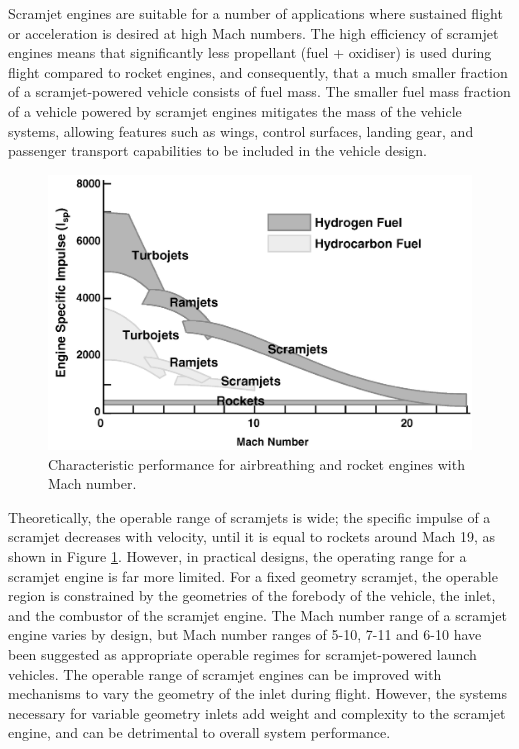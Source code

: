     Scramjet engines are suitable for a number of applications where sustained flight or acceleration is desired at high Mach numbers. 
    The high efficiency of scramjet engines means that significantly less propellant (fuel + oxidiser) is used during flight compared to rocket engines, and consequently, that a much smaller fraction of a scramjet-powered vehicle consists of fuel mass\cite{Curran2003}. 
    The smaller fuel mass fraction of a vehicle powered by scramjet engines mitigates the mass of the vehicle systems, allowing features such as wings, control surfaces, landing gear, and passenger transport capabilities to be included in the vehicle design\cite{Curran2003}. 
    
    \begin{figure}[ht]
    	\centering
    	\includegraphics[width=0.7\linewidth]{figures/2_literature-review/Scramjet-Efficiency}
    	\caption{Characteristic performance for airbreathing and rocket engines with Mach number\cite{Fry2004}.}
    	\label{fig:Scramjet-Efficiency}
    \end{figure}
    
    Theoretically, the operable range of scramjets is wide\cite{Smart2007a}; the specific impulse of a scramjet decreases with velocity, until it is equal to rockets around Mach 19\cite{Fry2004}, as shown in Figure \ref{fig:Scramjet-Efficiency}. 
    However, in practical designs, the operating range for a scramjet engine is far more limited. 
    For a fixed geometry scramjet, the operable region is constrained by the geometries of the forebody of the vehicle, the inlet, and the combustor of the scramjet engine\cite{Smart2010}.  
    The Mach number range of a scramjet engine varies by design, but Mach number ranges of 5-10\cite{Preller2017b}, 7-11\cite{Dalle2014} and 6-10\cite{Bradford2000} have been suggested as appropriate operable regimes for scramjet-powered launch vehicles.
    The operable range of scramjet engines can be improved with mechanisms to vary the geometry of the inlet during flight\cite{Dalle2011}. However, the systems necessary for variable geometry inlets add weight and complexity to the scramjet engine, and can be detrimental to overall system performance\cite{Smart2010}. 
    
